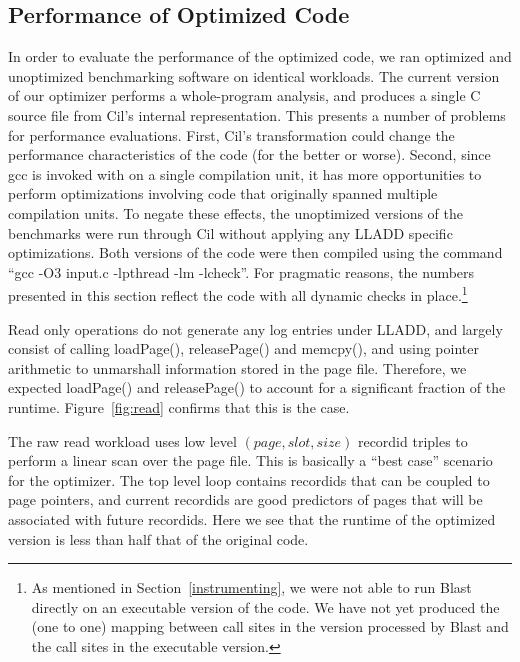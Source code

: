 \documentclass[10pt,letterpaper,twocolumn,english]{article}
\newcommand{\yad}{LLADD\xspace}
\newcommand{\pin}{loadPage()\xspace}
\newcommand{\unpin}{releasePage()\xspace}
\begin{document}
%

\subsection{Performance of Optimized Code}
\label{codePerformance}

In order to evaluate the performance of the optimized code, we ran
optimized and unoptimized benchmarking software on identical
workloads.  The current version of our optimizer performs a
whole-program analysis, and produces a single C source file from Cil's
internal representation.  This presents a number of problems for
performance evaluations.  First, Cil's transformation could change the
performance characteristics of the code (for the better or worse).
Second, since gcc is invoked with on a single compilation unit, it has
more opportunities to perform optimizations involving code that
originally spanned multiple compilation units.  To negate these
effects, the unoptimized versions of the benchmarks were run through
Cil without applying any \yad specific optimizations.  Both versions
of the code were then compiled using the command ``gcc -O3 input.c
-lpthread -lm -lcheck''.  For pragmatic reasons, the numbers presented
in this section reflect the code with all dynamic checks in
place.\footnote{As mentioned in Section~\ref{instrumenting}, we were
not able to run Blast directly on an executable version of the code.
We have not yet produced the (one to one) mapping between call sites
in the version processed by Blast and the call sites in the executable version.}

Read only operations do not generate any log entries under \yad, and
largely consist of calling \pin, \unpin and memcpy(), and using
pointer arithmetic to unmarshall information stored in the page file.
Therefore, we expected \pin and \unpin to account for a significant
fraction of the runtime.  Figure~\ref{fig:read} confirms that this is
the case.

The raw read workload uses low level $(page, slot, size)$ recordid
triples to perform a linear scan over the page file.  This is
basically a ``best case'' scenario for the optimizer.  The top level
loop contains recordids that can be coupled to page pointers, and
current recordids are good predictors of pages that will be associated
with future recordids.  Here we see that the runtime of the optimized
version is less than half that of the original code.
\end{document}
